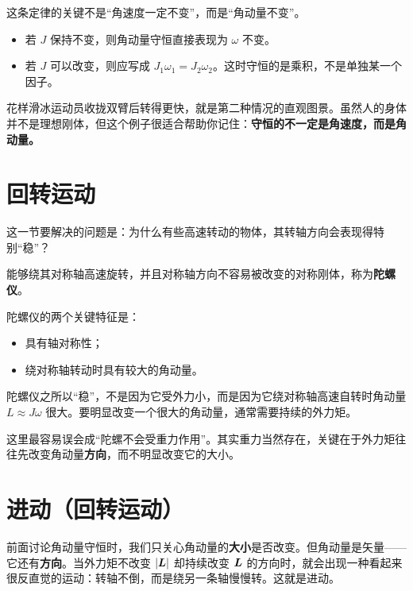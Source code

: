 \documentclass[lang=cn,11pt]{elegantbook}
\newcommand{\bridge}[1]{\begin{note}#1\end{note}}
\begin{document}
这条定律的关键不是“角速度一定不变”，而是“角动量不变”。

\begin{itemize}
  \item 若 \(J\) 保持不变，则角动量守恒直接表现为 \(\omega\) 不变。
  \item 若 \(J\) 可以改变，则应写成 \(J_1\omega_1=J_2\omega_2\)。这时守恒的是乘积，不是单独某一个因子。
\end{itemize}

\begin{remark}
花样滑冰运动员收拢双臂后转得更快，就是第二种情况的直观图景。虽然人的身体并不是理想刚体，但这个例子很适合帮助你记住：\textbf{守恒的不一定是角速度，而是角动量。}
\end{remark}

\section{回转运动}

这一节要解决的问题是：为什么有些高速转动的物体，其转轴方向会表现得特别“稳”？

\begin{definition}[陀螺仪]
能够绕其对称轴高速旋转，并且对称轴方向不容易被改变的对称刚体，称为\textbf{陀螺仪}。
\end{definition}

陀螺仪的两个关键特征是：
\begin{itemize}
  \item 具有轴对称性；
  \item 绕对称轴转动时具有较大的角动量。
\end{itemize}

陀螺仪之所以“稳”，不是因为它受外力小，而是因为它绕对称轴高速自转时角动量 \(L\approx J\omega\) 很大。要明显改变一个很大的角动量，通常需要持续的外力矩。

\begin{note}
这里最容易误会成“陀螺不会受重力作用”。其实重力当然存在，关键在于外力矩往往先改变角动量\textbf{方向}，而不明显改变它的大小。
\end{note}

\section{进动（回转运动）}

\bridge{前面讨论角动量守恒时，我们只关心角动量的\textbf{大小}是否改变。但角动量是矢量——它还有\textbf{方向}。当外力矩不改变 \(|\vb*{L}|\) 却持续改变 \(\vb*{L}\) 的方向时，就会出现一种看起来很反直觉的运动：转轴不倒，而是绕另一条轴慢慢转。这就是进动。}
\end{document}
